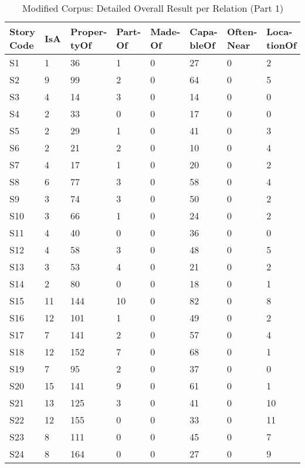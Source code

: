 \begin{table}[H]   %
\centering
\caption{Modified Corpus: Detailed Overall Result per Relation (Part 1)} \vspace{0.25em}
\begin{tabular}{|p{1.5cm}|p{.75cm}|p{1.5cm}|p{1cm}|p{1.25cm}|p{1.25cm}|p{1.5cm}|p{1.5cm}|} \hline
\textbf{Story Code} & \textbf{IsA} & \textbf{Proper-tyOf} & \textbf{Part-Of}  & \textbf{Made-Of} & \textbf{Capa-bleOf} & \textbf{Often-Near} & \textbf{Loca-tionOf} \\ \hline
S1 & 1 & 36 & 1 & 0 & 27 & 0 & 2 \\ \hline
S2 & 9 & 99 & 2 & 0 & 64 & 0 & 5 \\ \hline
S3 & 4 & 14 & 3 & 0 & 14 & 0 & 0 \\ \hline
S4 & 2 & 33 & 0 & 0 & 17 & 0 & 0 \\ \hline
S5 & 2 & 29 & 1 & 0 & 41 & 0 & 3 \\ \hline
S6 & 2 & 21 & 2 & 0 & 10 & 0 & 4 \\ \hline
S7 & 4 & 17 & 1 & 0 & 20 & 0 & 2 \\ \hline
S8 & 6 & 77 & 3 & 0 & 58 & 0 & 4 \\ \hline
S9 & 3 & 74 & 3 & 0 & 50 & 0 & 2 \\ \hline
S10 & 3 & 66 & 1 & 0 & 24 & 0 & 2 \\ \hline
S11 & 4 & 40 & 0 & 0 & 36 & 0 & 0 \\ \hline
S12 & 4 & 58 & 3 & 0 & 48 & 0 & 5 \\ \hline
S13 & 3 & 53 & 4 & 0 & 21 & 0 & 2 \\ \hline
S14 & 2 & 80 & 0 & 0 & 18 & 0 & 1 \\ \hline
S15 & 11 & 144 & 10 & 0 & 82 & 0 & 8 \\ \hline
S16 & 12 & 101 & 1 & 0 & 49 & 0 & 2 \\ \hline
S17 & 7 & 141 & 2 & 0 & 57 & 0 & 4 \\ \hline
S18 & 12 & 152 & 7 & 0 & 68 & 0 & 1 \\ \hline
S19 & 7 & 95 & 2 & 0 & 37 & 0 & 0 \\ \hline
S20 & 15 & 141 & 9 & 0 & 61 & 0 & 1 \\ \hline
S21 & 13 & 125 & 3 & 0 & 41 & 0 & 10 \\ \hline
S22 & 12 & 155 & 0 & 0 & 33 & 0 & 11 \\ \hline
S23 & 8 & 111 & 0 & 0 & 45 & 0 & 7 \\ \hline
S24 & 8 & 164 & 0 & 0 & 27 & 0 & 9 \\ \hline

\end{tabular}
\end{table}
